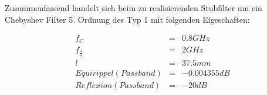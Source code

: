 Zusammenfassend handelt sich beim zu realisierenden Stubfilter um ein Chebyshev Filter 5. Ordnung des Typ 1 mit folgenden Eigeschaften: 
\begin{mdframed}
    \begin{equation*} 
        \begin{array}{cllll} 
            f_C & = & 0.8 GHz \\ 
            f_\frac{\lambda}{4} & = & 2 GHz \\ 
            l & = & 37.5mm \\
            Equirippel (Passband) & = & -0.004355 dB \\
            Reflexion (Passband) & = & -20 dB \\
        \end{array} 
    \end{equation*} 
\end{mdframed}



